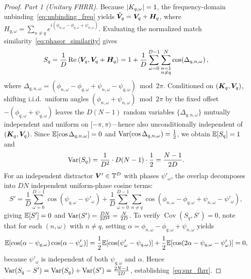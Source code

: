 \begin{proof}
\emph{Part 1 (Unitary FHRR).}
Because $\left\lvert K_{q,\omega} \right\rvert = 1$, the frequency-domain unbinding~\eqref{eq:unbinding_freq} yields $\hat{\boldsymbol{V}}_q = \boldsymbol{V}_q + \boldsymbol{H}_q$, where $H_{q,\omega} = \sum_{n \neq q} e^{i(\phi_{n,\omega} - \phi_{q,\omega} + \psi_{n,\omega})}$.
Evaluating the normalized match similarity~\eqref{eq:phasor_similarity} gives
\begin{equation}\label{eq:fhrr_sq_expand}
    S_q = \frac{1}{D}\operatorname{Re}\left\langle \boldsymbol{V}_q, \boldsymbol{V}_q + \boldsymbol{H}_q \right\rangle
    = 1 + \frac{1}{D} \sum_{\omega=0}^{D-1} \sum_{\substack{n=1 \\ n \neq q}}^{N} \cos\!\left(\Delta_{q,n,\omega}\right),
\end{equation}
where $\Delta_{q,n,\omega} = \left(\phi_{n,\omega} - \phi_{q,\omega} + \psi_{n,\omega} - \psi_{q,\omega}\right) \bmod 2\pi$.
Conditioned on $(\boldsymbol{K}_q, \boldsymbol{V}_q)$, shifting i.i.d.\ uniform angles $(\phi_{n,\omega} + \psi_{n,\omega}) \bmod 2\pi$ by the fixed offset $-(\phi_{q,\omega} + \psi_{q,\omega})$ leaves the $D(N-1)$ random variables $\{\Delta_{q,n,\omega}\}$ mutually independent and uniform on $[-\pi, \pi)$---hence also unconditionally independent of $(\boldsymbol{K}_q, \boldsymbol{V}_q)$.
Since $\mathbb{E}[\cos\Delta_{q,n,\omega}] = 0$ and $\operatorname{Var}(\cos\Delta_{q,n,\omega}) = \frac{1}{2}$, we obtain $\mathbb{E}[S_q] = 1$ and
\begin{equation*}
    \operatorname{Var}(S_q) = \frac{1}{D^2} \cdot D(N - 1) \cdot \frac{1}{2} = \frac{N - 1}{2D}.
\end{equation*}
For an independent distractor $\boldsymbol{V}' \in \mathbb{T}^D$ with phases $\psi'_\omega$, the overlap decomposes into $DN$ independent uniform-phase cosine terms:
\begin{equation*}
    S' = \frac{1}{D}\sum_{\omega=0}^{D-1} \cos(\psi_{q,\omega} - \psi'_\omega)
       + \frac{1}{D}\sum_{\omega=0}^{D-1}\sum_{n \neq q} \cos\!\left(\phi_{n,\omega} - \phi_{q,\omega} + \psi_{n,\omega} - \psi'_\omega\right),
\end{equation*}
giving $\mathbb{E}[S'] = 0$ and $\operatorname{Var}(S') = \frac{DN}{2D^2} = \frac{N}{2D}$.
To verify $\operatorname{Cov}(S_q, S') = 0$, note that for each $(n, \omega)$ with $n \neq q$, setting $\alpha = \phi_{n,\omega} - \phi_{q,\omega} + \psi_{n,\omega}$ yields
\begin{equation*}
    \mathbb{E}\!\left[\cos(\alpha - \psi_{q,\omega})\cos(\alpha - \psi'_\omega)\right]
    = \frac{1}{2}\mathbb{E}\!\left[\cos(\psi'_\omega - \psi_{q,\omega})\right]
    + \frac{1}{2}\mathbb{E}\!\left[\cos(2\alpha - \psi_{q,\omega} - \psi'_\omega)\right]
    = 0,
\end{equation*}
because $\psi'_\omega$ is independent of both $\psi_{q,\omega}$ and $\alpha$.
Hence $\operatorname{Var}(S_q - S') = \operatorname{Var}(S_q) + \operatorname{Var}(S') = \frac{2N - 1}{2D}$, establishing~\eqref{eq:snr_fhrr}.


\end{proof}
